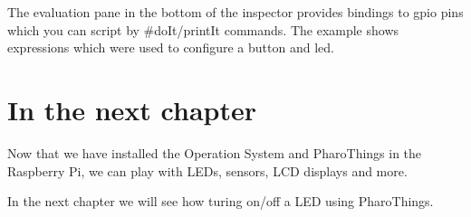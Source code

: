 \documentclass[10pt,twoside,english]{_support/latex/sbabook/sbabook}
\begin{document}
The evaluation pane in the bottom of the inspector provides bindings to gpio pins which you can script by \#doIt/printIt commands. The example shows expressions which were used to configure a button and led.
\section{In the next chapter}
Now that we have installed the Operation System and PharoThings in the Raspberry Pi, we can play with LEDs, sensors, LCD displays and more. 

In the next chapter we will see how turing on/off a LED using PharoThings. 


\backmatter

\end{document}
